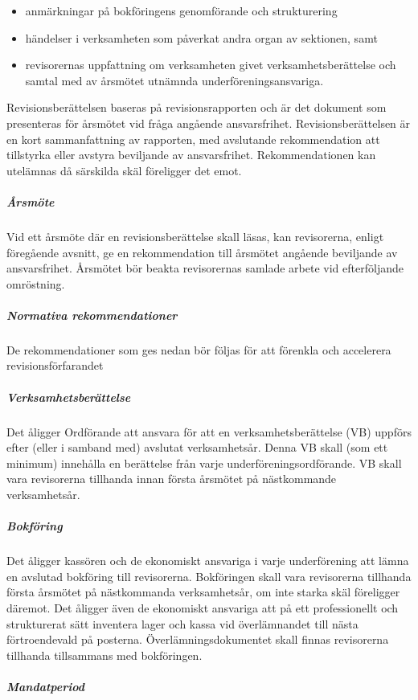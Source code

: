 \documentclass{../resources/dgovdoc}
\begin{document}
\begin{itemize}
\item anmärkningar på bokföringens genomförande och strukturering
\item händelser i verksamheten som påverkat andra organ av sektionen, samt
\item revisorernas uppfattning om verksamheten givet verksamhetsberättelse och samtal med av årsmötet utnämnda underföreningsansvariga.
\end{itemize}

Revisionsberättelsen baseras på revisionsrapporten och är det dokument som presenteras för årsmötet vid fråga angående ansvarsfrihet. Revisionsberättelsen är en kort sammanfattning av rapporten, med avslutande rekommendation att tillstyrka eller avstyra beviljande av ansvarsfrihet. Rekommendationen kan utelämnas då särskilda skäl föreligger det emot.

\subparagraph{Årsmöte}

Vid ett årsmöte där en revisionsberättelse skall läsas, kan revisorerna, enligt föregående avsnitt, ge en rekommendation till årsmötet angående beviljande av ansvarsfrihet. Årsmötet bör beakta revisorernas samlade arbete vid efterföljande omröstning.

\subparagraph{Normativa rekommendationer}

De rekommendationer som ges nedan bör följas för att förenkla och accelerera revisionsförfarandet

\subparagraph{Verksamhetsberättelse}

Det åligger Ordförande att ansvara för att en verksamhetsberättelse (VB) uppförs efter (eller i samband med) avslutat verksamhetsår. Denna VB skall (som ett minimum) innehålla en berättelse från varje underföreningsordförande. VB skall vara revisorerna tillhanda innan första årsmötet på nästkommande verksamhetsår.

\subparagraph{Bokföring}

Det åligger kassören och de ekonomiskt ansvariga i varje underförening att lämna en avslutad bokföring till revisorerna. Bokföringen skall vara revisorerna tillhanda första årsmötet på nästkommanda verksamhetsår, om inte starka skäl föreligger däremot.
Det åligger även de ekonomiskt ansvariga att på ett professionellt och strukturerat sätt inventera lager och kassa vid överlämnandet till nästa förtroendevald på posterna. Överlämningsdokumentet skall finnas revisorerna tillhanda tillsammans med bokföringen. 

\subparagraph{Mandatperiod}
\end{document}
